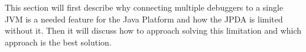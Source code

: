 \documentclass[..thesis.tex]{subfiles}
\begin{document}
This section will first describe why connecting multiple debuggers to a single JVM is a needed feature for the Java Platform and how the JPDA is limited without it.
Then it will discuss how to approach solving this limitation and which approach is the best solution.
\end{document}
